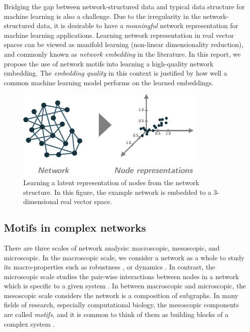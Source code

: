 \documentclass{article}
\theoremstyle{definition}
\begin{document}
Bridging the gap between network-structured data and typical
data structure for machine learning is also a challenge. 
Due to the irregularity in the network-structured data, 
it is desirable to have a \emph{meaningful}
network representation for machine learning applications. 
Learning network representation in real vector spaces can be
viewed as manifold learning (non-linear dimensionality reduction),
and commonly known as \emph{network embedding} in the literature.
In this report, we propose the use of network motifs into learning
a high-quality network embedding. The \emph{embedding quality} in this
context is justified by how well a common machine learning model performs 
on the learned embeddings.

\begin{figure} \label{fig:cartoon}
    \centering
    \includegraphics[width=0.7\linewidth]{cartoon_emb}
    \caption{Learning a latent representation of nodes from the network structure. In this figure, the example network is embedded to a 3-dimensional real vector space.}
\end{figure}

\subsection{Motifs in complex networks}

There are three scales of network analysis: macroscopic, mesoscopic, 
and microscopic. In the macroscopic scale, we consider a network as a 
whole to study its macro-properties such as robustness 
\cite{callaway2000network}, or dynamics \cite{barabasi2014network}.
In contrast, the microscopic scale studies the pair-wise interactions
between nodes in a network which is specific to a given system 
\cite{physicnet}. In between macroscopic and microscopic, the mesoscopic 
scale considers the network is a composition of subgraphs. 
In many fields of research, especially computational biology, the
mesoscopic components are called \emph{motifs}, and it is common
to think of them as building blocks of a complex system 
\cite{motifblockmilo}.
\end{document}

